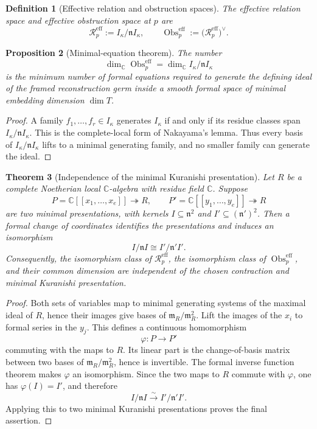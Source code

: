 \documentclass[11pt]{amsart}
\newtheorem{theorem}{Theorem}[section]
\newtheorem{proposition}[theorem]{Proposition}
\newtheorem{definition}[theorem]{Definition}
\newcommand{\Obs}{\operatorname{Obs}}
\newcommand{\C}{\mathbb C}
\begin{document}
\begin{definition}[Effective relation and obstruction spaces]\label{def:effective-obstruction}
The effective relation space and effective obstruction space at $p$ are
\[
\mathscr R^{\mathrm{eff}}_p
:=
I_\kappa/\mathfrak n I_\kappa,
\qquad
\Obs^{\mathrm{eff}}_p
:=
\bigl(\mathscr R^{\mathrm{eff}}_p\bigr)^\vee.
\]
\end{definition}

\begin{proposition}[Minimal-equation theorem]\label{prop:minimal-equations}
The number
\[
\dim_\C\Obs^{\mathrm{eff}}_p
=
\dim_\C I_\kappa/\mathfrak n I_\kappa
\]
is the minimum number of formal equations required to generate the defining ideal of the framed reconstruction germ inside a smooth formal space of minimal embedding dimension $\dim T$.
\end{proposition}

\begin{proof}
A family $f_1,\ldots,f_r\in I_\kappa$ generates $I_\kappa$ if and only if its residue classes span $I_\kappa/\mathfrak n I_\kappa$.  This is the complete-local form of Nakayama's lemma.  Thus every basis of $I_\kappa/\mathfrak n I_\kappa$ lifts to a minimal generating family, and no smaller family can generate the ideal.
\end{proof}

\begin{theorem}[Independence of the minimal Kuranishi presentation]\label{thm:effective-intrinsic}
Let $R$ be a complete Noetherian local $\C$-algebra with residue field $\C$.  Suppose
\[
P=\C[[x_1,\ldots,x_e]]\twoheadrightarrow R,
\qquad
P'=\C[[y_1,\ldots,y_e]]\twoheadrightarrow R
\]
are two minimal presentations, with kernels $I\subseteq\mathfrak n^2$ and $I'\subseteq(\mathfrak n')^2$.  Then a formal change of coordinates identifies the presentations and induces an isomorphism
\[
I/\mathfrak n I
\cong
I'/\mathfrak n'I'.
\]
Consequently, the isomorphism class of $\mathscr R^{\mathrm{eff}}_p$, the isomorphism class of $\Obs^{\mathrm{eff}}_p$, and their common dimension are independent of the chosen contraction and minimal Kuranishi presentation.
\end{theorem}

\begin{proof}
Both sets of variables map to minimal generating systems of the maximal ideal of $R$, hence their images give bases of $\mathfrak m_R/\mathfrak m_R^2$.  Lift the images of the $x_i$ to formal series in the $y_j$.  This defines a continuous homomorphism
\[
\varphi:P\longrightarrow P'
\]
commuting with the maps to $R$.  Its linear part is the change-of-basis matrix between two bases of $\mathfrak m_R/\mathfrak m_R^2$, hence is invertible.  The formal inverse function theorem makes $\varphi$ an isomorphism.  Since the two maps to $R$ commute with $\varphi$, one has $\varphi(I)=I'$, and therefore
\[
I/\mathfrak n I\xrightarrow{\sim}I'/\mathfrak n'I'.
\]
Applying this to two minimal Kuranishi presentations proves the final assertion.
\end{proof}
\end{document}
